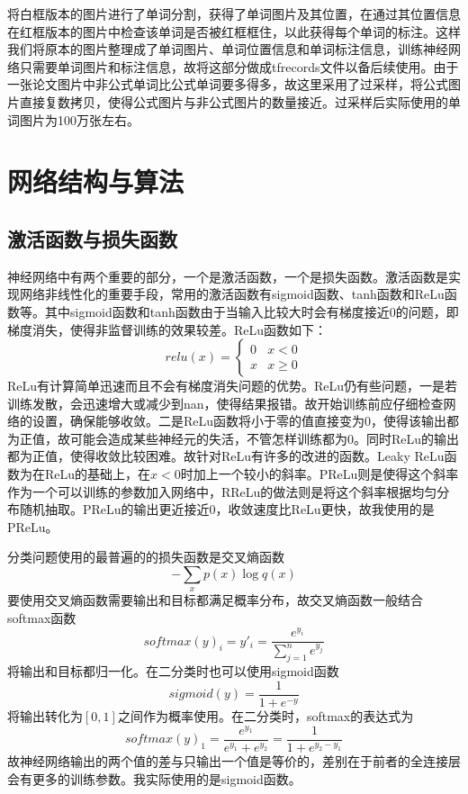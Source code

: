 将白框版本的图片进行了单词分割，获得了单词图片及其位置，在通过其位置信息在红框版本的图片中检查该单词是否被红框框住，以此获得每个单词的标注。这样我们将原本的图片整理成了单词图片、单词位置信息和单词标注信息，训练神经网络只需要单词图片和标注信息，故将这部分做成tfrecords文件以备后续使用。由于一张论文图片中非公式单词比公式单词要多得多，故这里采用了过采样，将公式图片直接复数拷贝，使得公式图片与非公式图片的数量接近。过采样后实际使用的单词图片为100万张左右。

\section{网络结构与算法}

\subsection{激活函数与损失函数}
\noindent

神经网络中有两个重要的部分，一个是激活函数，一个是损失函数。激活函数是实现网络非线性化的重要手段，常用的激活函数有sigmoid函数、tanh函数和ReLu函数等。其中sigmoid函数和tanh函数由于当输入比较大时会有梯度接近0的问题，即梯度消失，使得非监督训练的效果较差。ReLu函数如下：
$$relu(x) = 
\begin{cases} 
0& x < 0\\
x& x \ge 0
\end{cases}$$
ReLu有计算简单迅速而且不会有梯度消失问题的优势。ReLu仍有些问题，一是若训练发散，会迅速增大或减少到nan，使得结果报错。故开始训练前应仔细检查网络的设置，确保能够收敛。二是ReLu函数将小于零的值直接变为0，使得该输出都为正值，故可能会造成某些神经元的失活，不管怎样训练都为0。同时ReLu的输出都为正值，使得收敛比较困难。故针对ReLu有许多的改进的函数。Leaky ReLu函数为在ReLu的基础上，在$x<0$时加上一个较小的斜率。PReLu则是使得这个斜率作为一个可以训练的参数加入网络中，RReLu的做法则是将这个斜率根据均匀分布随机抽取。PReLu的输出更近接近0，收敛速度比ReLu更快，故我使用的是PReLu。

分类问题使用的最普遍的的损失函数是交叉熵函数$$- \sum_x p(x) \log q(x)$$ 要使用交叉熵函数需要输出和目标都满足概率分布，故交叉熵函数一般结合softmax函数$$softmax(y)_i = y'_i = \frac{e^{y_i}}{\sum^n_{j=1} e^{y_j}}$$将输出和目标都归一化。在二分类时也可以使用sigmoid函数$$sigmoid(y) = \frac 1 {1 + e^{-y}}$$将输出转化为$[0, 1]$之间作为概率使用。在二分类时，softmax的表达式为$$softmax(y)_1 = \frac{e^{y_1}}{e^{y_1} + e^{y_2}} = \frac 1 {1 + e^{y_2 - y_1}}$$ 故神经网络输出的两个值的差与只输出一个值是等价的，差别在于前者的全连接层会有更多的训练参数。我实际使用的是sigmoid函数。

